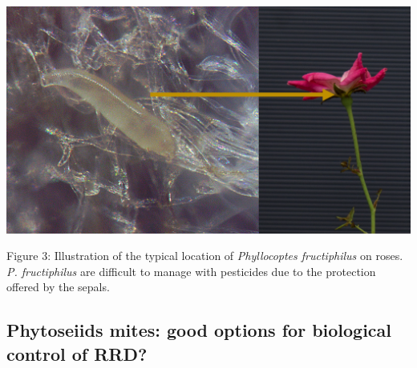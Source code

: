 \documentclass[12pt,final,CPage]{ufthesis}
\begin{document}
{  \begin{center}\includegraphics[width=0.8\linewidth]{figure/mite-pfruct-hide} \end{center}

  Figure 3: Illustration of the typical location of \emph{Phyllocoptes fructiphilus} on roses. \emph{P. fructiphilus} are difficult to manage with pesticides due to the protection offered by the sepals.

  \hypertarget{ipm-preds-litrev}{%
  \subsection{Phytoseiids mites: good options for biological control of RRD?}\label{ipm-preds-litrev}}

}
\end{document}
